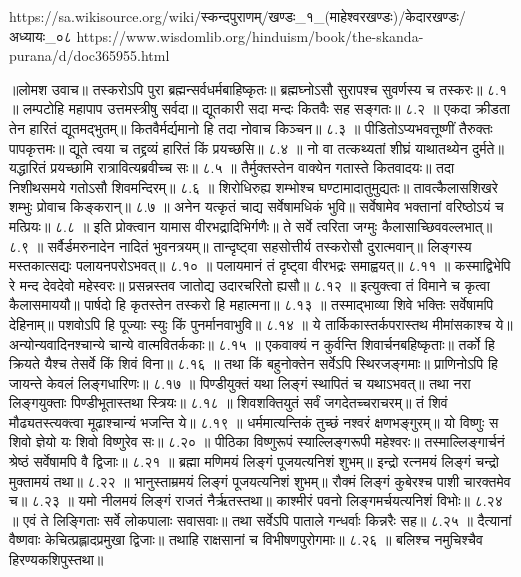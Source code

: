 https://sa.wikisource.org/wiki/स्कन्दपुराणम्/खण्डः_१_(माहेश्वरखण्डः)/केदारखण्डः/अध्यायः_०८
https://www.wisdomlib.org/hinduism/book/the-skanda-purana/d/doc365955.html

॥लोमश उवाच॥
तस्करोऽपि पुरा ब्रह्मन्सर्वधर्मबाहिष्कृतः॥
ब्रह्मघ्नोऽसौ सुरापश्च सुवर्णस्य च तस्करः॥ ८.१ ॥
लम्पटोहि महापाप उत्तमस्त्रीषु सर्वदा॥
द्यूतकारी सदा मन्दः कितवैः सह सङ्गतः॥ ८.२ ॥
एकदा क्रीडता तेन हारितं द्यूतमद्भुतम्॥
कितवैर्मर्द्यमानो हि तदा नोवाच किञ्चन॥ ८.३ ॥
पीडितोऽप्यभवत्तूष्णीं तैरुक्तः पापकृत्तमः॥
द्यूते त्वया च तद्द्रव्यं हारितं किं प्रयच्छसि॥ ८.४ ॥
नो वा तत्कथ्यतां शीघ्रं याथातथ्येन दुर्मते॥
यद्धारितं प्रयच्छामि रात्रावित्यब्रवीच्च सः॥ ८.५ ॥
तैर्मुक्तस्तेन वाक्येन गतास्ते कितवादयः॥
तदा निशीथसमये गतोऽसौ शिवमन्दिरम्॥ ८.६ ॥
शिरोधिरुह्य शम्भोश्च घण्टामादातुमुद्यतः॥
तावत्कैलासशिखरे शम्भुः प्रोवाच किङ्करान्॥ ८.७ ॥
अनेन यत्कृतं चाद्य सर्वेषामधिकं भुवि॥
सर्वेषामेव भक्तानां वरिष्ठोऽयं च मत्प्रियः॥ ८.८ ॥
इति प्रोक्त्वान यामास वीरभद्रादिभिर्गणैः॥
ते सर्वे त्वरिता जग्मुः कैलासाच्छिववल्लभात्॥ ८.९ ॥
सर्वैर्डमरुनादेन नादितं भुवनत्रयम्॥
तान्दृष्ट्वा सहसोत्तीर्य तस्करोसौ दुरात्मवान्॥
लिङ्गस्य मस्तकात्सद्यः पलायनपरोऽभवत्॥ ८.१० ॥
पलायमानं तं दृष्ट्वा वीरभद्रः समाह्वयत्॥ ८.११ ॥
कस्माद्विभेपि रे मन्द देवदेवो महेस्वरः॥
प्रसन्नस्तव जातोद्य उदारचरितो ह्यसौ॥ ८.१२ ॥
इत्युक्त्वा तं विमाने च कृत्वा कैलासमाययौ॥
पार्षदो हि कृतस्तेन तस्करो हि महात्मना॥ ८.१३ ॥
तस्माद्भाव्या शिवे भक्तिः सर्वेषामपि देहिनाम्॥
पशवोऽपि हि पूज्याः स्युः किं पुनर्मानवाभुवि॥ ८.१४ ॥
ये तार्किकास्तर्कपरास्तथ मीमांसकाश्च ये॥
अन्योन्यवादिनश्चान्ये चान्ये वात्मवितर्ककाः॥ ८.१५ ॥
एकवाक्यं न कुर्वन्ति शिवार्चनबहिष्कृताः॥
तर्को हि क्रियते यैश्च तेसर्वे किं शिवं विना॥ ८.१६ ॥
तथा किं बहुनोक्तेन सर्वेऽपि स्थिरजङ्गमाः॥
प्राणिनोऽपि हि जायन्ते केवलं लिङ्गधारिणः॥ ८.१७ ॥
पिण्डीयुक्तं यथा लिङ्गं स्थापितं च यथाऽभवत्॥
तथा नरा लिङ्गयुक्ताः पिण्डीभूतास्तथा स्त्रियः॥ ८.१८ ॥
शिवशक्तियुतं सर्वं जगदेतच्चराचरम्॥
तं शिवं मौढ्यतस्त्यक्त्वा मूढाश्चान्यं भजन्ति ये॥ ८.१९ ॥
धर्ममात्यन्तिकं तुच्छं नश्वरं क्षणभङ्गुरम्॥
यो विष्णुः स शिवो ज्ञेयो यः शिवो विष्णुरेव सः॥ ८.२० ॥
पीठिका विष्णुरूपं स्याल्लिङ्गरूपी महेश्वरः॥
तस्माल्लिङ्गार्चनं श्रेष्ठं सर्वेषामपि वै द्विजाः॥ ८.२१ ॥
ब्रह्मा मणिमयं लिङ्गं पूजयत्यनिशं शुभम्॥
इन्द्रो रत्नमयं लिङ्गं चन्द्रो मुक्तामयं तथा॥ ८.२२ ॥
भानुस्ताम्रमयं लिङ्गं पूजयत्यनिशं शुभम्॥
रौक्मं लिङ्गं कुबेरश्च पाशी चारक्तमेव च॥ ८.२३ ॥
यमो नीलमयं लिङ्गं राजतं नैर्ऋतस्तथा॥
काश्मीरं पवनो लिङ्गमर्चयत्यनिशं विभोः॥ ८.२४ ॥
एवं ते लिङ्गिताः सर्वे लोकपालाः सवासवाः॥
तथा सर्वेऽपि पाताले गन्धर्वाः किन्नरैः सह॥ ८.२५ ॥
दैत्यानां वैष्णवाः केचित्प्रह्लादप्रमुखा द्विजाः॥
तथाहि राक्षसानां च विभीषणपुरोगमाः॥ ८.२६ ॥
बलिश्च नमुचिश्चैव हिरण्यकशिपुस्तथा॥
